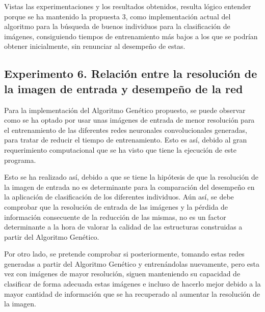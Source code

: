 Vistas las experimentaciones y los resultados obtenidos, resulta lógico entender porque se ha mantenido la propuesta 3, como implementación actual del algoritmo para la búsqueda de buenos individuos para la clasificación de imágenes, consiguiendo tiempos de entrenamiento más bajos a los que se podrían obtener inicialmente, sin renunciar al desempeño de estas.

\subsection{Experimento 6. Relación entre la resolución de la imagen de entrada y desempeño de la red}

Para la implementación del Algoritmo Genético propuesto, se puede observar como se ha optado por usar unas imágenes de entrada de menor resolución para el entrenamiento de las diferentes redes neuronales convolucionales generadas, para tratar de reducir el tiempo de entrenamiento. Esto es así, debido al gran requerimiento computacional que se ha visto que tiene la ejecución de este programa.

Esto se ha realizado así, debido a que se tiene la hipótesis de que la resolución de la imagen de entrada no es determinante para la comparación del desempeño en la aplicación de clasificación de los diferentes individuos. Aún así, se debe comprobar que la resolución de entrada de las imágenes y la pérdida de información consecuente de la reducción de las mismas, no es un factor determinante a la hora de valorar la calidad de las estructuras construidas a partir del Algoritmo Genético.

Por otro lado, se pretende comprobar si posteriormente, tomando estas redes generadas a partir del Algoritmo Genético y entrenándolas nuevamente, pero esta vez con imágenes de mayor resolución, siguen manteniendo su capacidad de clasificar de forma adecuada estas imágenes e incluso de hacerlo mejor debido a la mayor cantidad de información que se ha recuperado al aumentar la resolución de la imagen.

